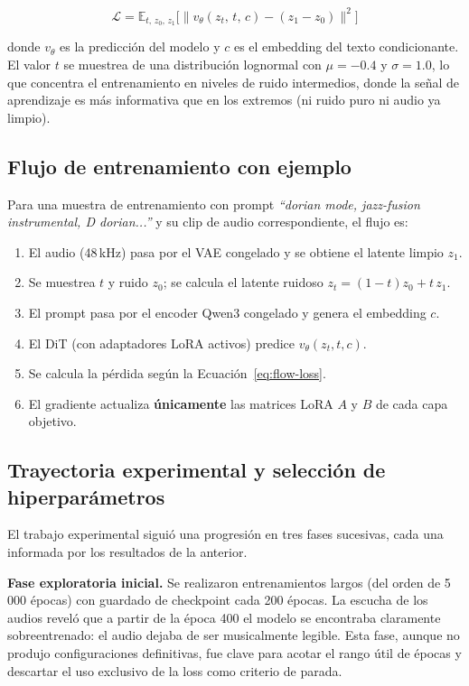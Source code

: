 \documentclass[%
    school=etsisi,%
    type=pfg,%
    degree=61CD,%
]{upm-report}
\begin{document}
\begin{equation}
    \mathcal{L} = \mathbb{E}_{t,\,z_0,\,z_1}\bigl[\|v_\theta(z_t,\,t,\,c) - (z_1 - z_0)\|^2\bigr]
    \label{eq:flow-loss}
\end{equation}

donde $v_\theta$ es la predicci\'on del modelo y $c$ es el embedding del texto condicionante. El valor $t$ se muestrea de una distribuci\'on lognormal con $\mu=-0.4$ y $\sigma=1.0$, lo que concentra el entrenamiento en niveles de ruido intermedios, donde la se\~nal de aprendizaje es m\'as informativa que en los extremos (ni ruido puro ni audio ya limpio).

\subsection{Flujo de entrenamiento con ejemplo}
\label{ss:training-flow}

Para una muestra de entrenamiento con prompt \textit{``dorian mode, jazz-fusion instrumental, D dorian...''} y su clip de audio correspondiente, el flujo es:

\begin{enumerate}
    \item El audio (48\,kHz) pasa por el VAE congelado y se obtiene el latente limpio $z_1$.
    \item Se muestrea $t$ y ruido $z_0$; se calcula el latente ruidoso $z_t = (1-t)z_0 + t\,z_1$.
    \item El prompt pasa por el encoder Qwen3 congelado y genera el embedding $c$.
    \item El DiT (con adaptadores LoRA activos) predice $v_\theta(z_t, t, c)$.
    \item Se calcula la p\'erdida seg\'un la Ecuaci\'on~\ref{eq:flow-loss}.
    \item El gradiente actualiza \textbf{\'unicamente} las matrices LoRA $A$ y $B$ de cada capa objetivo.
\end{enumerate}

\subsection{Trayectoria experimental y selecci\'on de hiperpar\'ametros}
\label{ss:training-curves}

El trabajo experimental sigui\'o una progresi\'on en tres fases sucesivas, cada una informada por los resultados de la anterior.

\textbf{Fase exploratoria inicial.} Se realizaron entrenamientos largos (del orden de 5\,000 \'epocas) con guardado de checkpoint cada 200 \'epocas. La escucha de los audios revel\'o que a partir de la \'epoca 400 el modelo se encontraba claramente sobreentrenado: el audio dejaba de ser musicalmente legible. Esta fase, aunque no produjo configuraciones definitivas, fue clave para acotar el rango \'util de \'epocas y descartar el uso exclusivo de la loss como criterio de parada.
\end{document}
